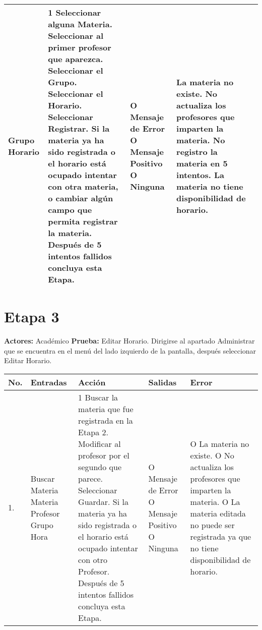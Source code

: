 \begin{longtable}{|p{0.7cm}|p{3cm}|p{6cm}|p{2.3cm}|p{3cm}|}
	Grupo\newline
	Horario	
	&
	1 Seleccionar alguna Materia.\newline
	2 Seleccionar al primer profesor que aparezca.\newline
	3 Seleccionar el Grupo.\newline
	4 Seleccionar el Horario.\newline
	5 Seleccionar Registrar.\newline
	6 Si la materia ya ha sido registrada o el horario está ocupado intentar con otra materia, o cambiar algún campo que permita registrar la materia. Después de 5 intentos fallidos  concluya esta Etapa.
	&
	O Mensaje de Error\newline
 	O Mensaje Positivo\newline
 	O Ninguna	 	
 	&
 	La materia no existe.\newline
 	No actualiza los profesores que imparten la materia.\newline
 	No registro la materia en 5 intentos.\newline
 	La materia no tiene disponibilidad de horario.\\
 	\hline
\end{longtable}
\section*{Etapa 3}
\textbf{Actores:} Académico\newline
\textbf{Prueba:} Editar Horario.\newline
Dirigirse al apartado Administrar que se encuentra en el menú del lado izquierdo de la pantalla, después seleccionar Editar Horario.
\begin{longtable}{|p{0.7cm}|p{3cm}|p{6cm}|p{2.3cm}|p{3cm}|}
    \hline	
	\textbf{No.}
	&
	\textbf{Entradas}	
	&
	\textbf{Acción}
	&
	\textbf{Salidas}
	&
	\textbf{Error}
	\\
    \hline	
	1.
	&
	Buscar Materia\newline
	Materia\newline
	Profesor\newline
	Grupo\newline
	Hora	
	&
	1 Buscar la materia que fue registrada en la Etapa 2.\newline
	2 Modificar al profesor por el segundo que parece.\newline
	3 Seleccionar Guardar.\newline
	4 Si la materia ya ha sido registrada o el horario está ocupado intentar con otro Profesor. Después de 5 intentos fallidos concluya esta Etapa.	 	
	&
	O Mensaje de Error\newline
 	O Mensaje Positivo\newline
 	O Ninguna	 	
 	&
 	O La materia no existe.\newline
 	O No actualiza los profesores que imparten la materia.\newline 
 	O La materia editada no puede ser registrada ya que no tiene disponibilidad de horario.\\
	\hline
\end{longtable}
\newpage
